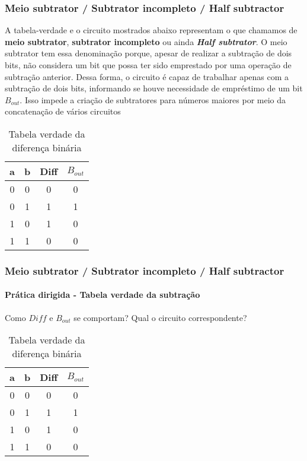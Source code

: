\begin{frame}
	\frametitle{Meio subtrator / Subtrator incompleto / Half subtractor}
	\par A tabela-verdade e o circuito mostrados abaixo representam o que chamamos de \textbf{meio subtrator}, \textbf{subtrator incompleto} ou ainda \textit{\textbf{Half subtrator}}. O meio subtrator tem essa denominação porque, apesar de realizar a subtração de dois bits, não considera um bit que possa ter sido emprestado por uma operação de subtração anterior. Dessa forma, o circuito é capaz de trabalhar apenas com a subtração de dois bits, informando se houve necessidade de empréstimo de um bit $B_{out}$. Isso impede a criação de subtratores para números maiores por meio da concatenação de vários circuitos
	\begin{table}[h!]
		\centering
		\begin{tabular}{|c|c|c|c|}
			\hline
			a & b & Diff & \(B_{out}\) \\ \hline
			0 & 0 & 0   & 0          \\ \hline
			0 & 1 & 1   & 1          \\ \hline
			1 & 0 & 1   & 0          \\ \hline
			1 & 1 & 0   & 0          \\ \hline
		\end{tabular}
		\caption{Tabela verdade da diferença binária}
		\label{tab:binary_subtraction}
	\end{table}
\end{frame}

\begin{frame}
	\frametitle{Meio subtrator / Subtrator incompleto / Half subtractor}
	\framesubtitle{\textbf{Prática dirigida} - Tabela verdade da subtração}
	\par Como $Diff$ e $B_{out}$ se comportam? Qual o circuito correspondente?
	\begin{table}[h!]
		\centering
		\begin{tabular}{|c|c|c|c|}
			\hline
			a & b & Diff & \(B_{out}\) \\ \hline
			0 & 0 & 0   & 0          \\ \hline
			0 & 1 & 1   & 1          \\ \hline
			1 & 0 & 1   & 0          \\ \hline
			1 & 1 & 0   & 0          \\ \hline
		\end{tabular}
		\caption{Tabela verdade da diferença binária}
		\label{tab:binary_subtraction2}
	\end{table}
\end{frame}


